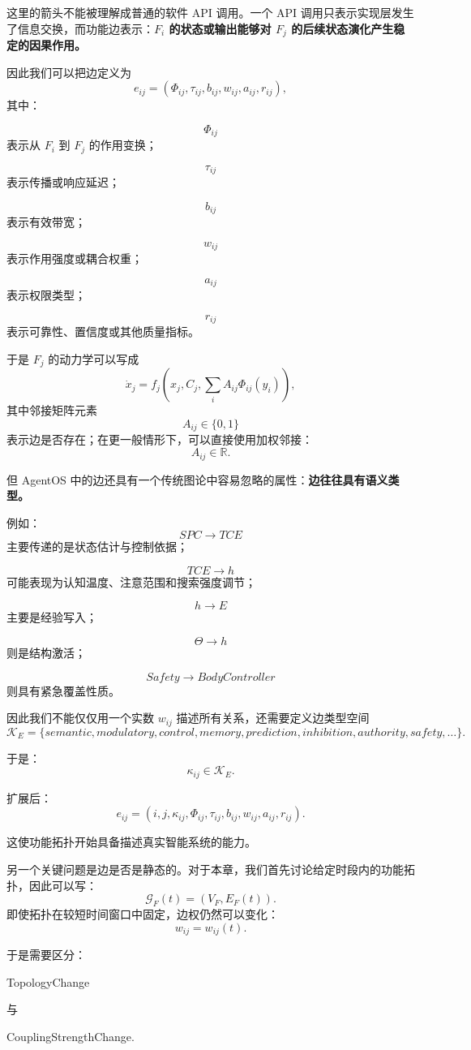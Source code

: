 这里的箭头不能被理解成普通的软件 API 调用。一个 API 调用只表示实现层发生了信息交换，而功能边表示：\textbf{$F_i$ 的状态或输出能够对 $F_j$ 的后续状态演化产生稳定的因果作用。}

因此我们可以把边定义为
\[
e_{ij}
=
\left(
\Phi_{ij},
\tau_{ij},
b_{ij},
w_{ij},
a_{ij},
r_{ij}
\right),
\]
其中：

\[
\Phi_{ij}
\]
表示从 $F_i$ 到 $F_j$ 的作用变换；

\[
\tau_{ij}
\]
表示传播或响应延迟；

\[
b_{ij}
\]
表示有效带宽；

\[
w_{ij}
\]
表示作用强度或耦合权重；

\[
a_{ij}
\]
表示权限类型；

\[
r_{ij}
\]
表示可靠性、置信度或其他质量指标。

于是 $F_j$ 的动力学可以写成
\[
\dot{x}_j
=
f_j
\left(
x_j,
C_j,
\sum_{i}
A_{ij}
\Phi_{ij}(y_i)
\right),
\]
其中邻接矩阵元素
\[
A_{ij}\in\{0,1\}
\]
表示边是否存在；在更一般情形下，可以直接使用加权邻接：
\[
A_{ij}\in\mathbb R.
\]

但 AgentOS 中的边还具有一个传统图论中容易忽略的属性：\textbf{边往往具有语义类型。}

例如：
\[
SPC\rightarrow TCE
\]
主要传递的是状态估计与控制依据；

\[
TCE\rightarrow h
\]
可能表现为认知温度、注意范围和搜索强度调节；

\[
h\rightarrow E
\]
主要是经验写入；

\[
\Theta\rightarrow h
\]
则是结构激活；

\[
Safety\rightarrow BodyController
\]
则具有紧急覆盖性质。

因此我们不能仅仅用一个实数 $w_{ij}$ 描述所有关系，还需要定义边类型空间
\[
\mathcal K_E
=
\{
semantic,
modulatory,
control,
memory,
prediction,
inhibition,
authority,
safety,
\ldots
\}.
\]

于是：
\[
\kappa_{ij}\in\mathcal K_E.
\]

扩展后：
\[
e_{ij}
=
\left(
i,j,
\kappa_{ij},
\Phi_{ij},
\tau_{ij},
b_{ij},
w_{ij},
a_{ij},
r_{ij}
\right).
\]

这使功能拓扑开始具备描述真实智能系统的能力。

另一个关键问题是边是否是静态的。对于本章，我们首先讨论给定时段内的功能拓扑，因此可以写：
\[
\mathcal G_F(t)
=
(V_F,E_F(t)).
\]
即使拓扑在较短时间窗口中固定，边权仍然可以变化：
\[
w_{ij}=w_{ij}(t).
\]

于是需要区分：
\begin{statementbox}
TopologyChange
\end{statementbox}
与
\begin{statementbox}
CouplingStrengthChange.
\end{statementbox}

